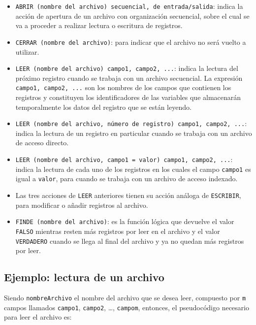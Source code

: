 \documentclass[
]{book}
\providecommand{\tightlist}{%
  \setlength{\itemsep}{0pt}\setlength{\parskip}{0pt}}
\begin{document}
\begin{itemize}
\tightlist
\item
  \texttt{ABRIR\ (nombre\ del\ archivo)\ secuencial,\ de\ entrada/salida}: indica la acción de apertura de un archivo con organización secuencial, sobre el cual se va a proceder a realizar lectura o escritura de registros.
\item
  \texttt{CERRAR\ (nombre\ del\ archivo)}: para indicar que el archivo no será vuelto a utilizar.
\item
  \texttt{LEER\ (nombre\ del\ archivo)\ campo1,\ campo2,\ ...}: indica la lectura del próximo registro cuando se trabaja con un archivo secuencial. La expresión \texttt{campo1,\ campo2,\ ...} son los nombres de los campos que contienen los registros y constituyen los identificadores de las variables que almacenarán temporalmente los datos del registro que se están leyendo.
\item
  \texttt{LEER\ (nombre\ del\ archivo,\ número\ de\ registro)\ campo1,\ campo2,\ ...}: indica la lectura de un registro en particular cuando se trabaja con un archivo de acceso directo.
\item
  \texttt{LEER\ (nombre\ del\ archivo,\ campo1\ =\ valor)\ campo1,\ campo2,\ ...}: indica la lectura de cada uno de los registros en los cuales el campo \texttt{campo1} es igual a \texttt{valor}, para cuando se trabaja con un archivo de acceso indexado.
\item
  Las tres acciones de \texttt{LEER} anteriores tienen su acción análoga de \texttt{ESCRIBIR}, para modificar o añadir registros al archivo.
\item
  \texttt{FINDE\ (nombre\ del\ archivo)}: es la función lógica que devuelve el valor \texttt{FALSO} mientras resten más registros por leer en el archivo y el valor \texttt{VERDADERO} cuando se llega al final del archivo y ya no quedan más registros por leer.
\end{itemize}

\hypertarget{ejemplo-lectura-de-un-archivo}{%
\subsection{Ejemplo: lectura de un archivo}\label{ejemplo-lectura-de-un-archivo}}

Siendo \texttt{nombreArchivo} el nombre del archivo que se desea leer, compuesto por \texttt{m} campos llamados \texttt{campo1}, \texttt{campo2}, \ldots, \texttt{campom}, entonces, el pseudocódigo necesario para leer el archivo es:
\end{document}
